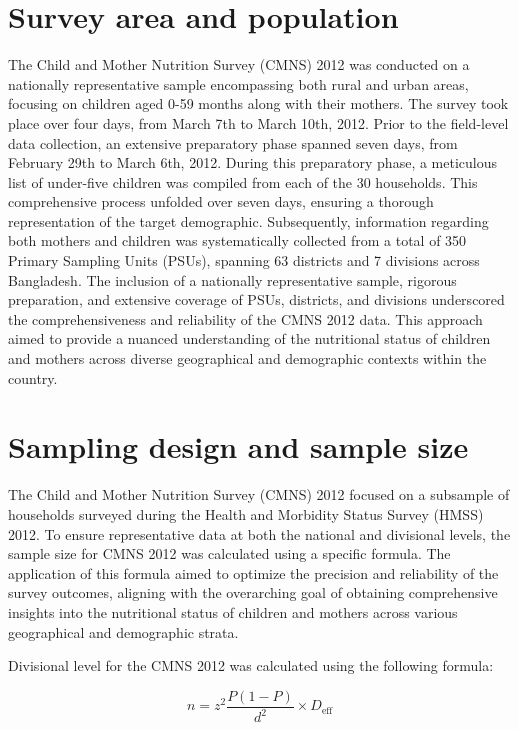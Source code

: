 \documentclass{report}
\begin{document}
\section{Survey area and population}

The Child and Mother Nutrition Survey (CMNS) 2012 was conducted on a nationally representative sample encompassing both rural and urban areas, focusing on children aged 0-59 months along with their mothers. 
The survey took place over four days, from March 7th to March 10th, 2012. Prior to the field-level data collection, an extensive preparatory phase spanned seven days, from February 29th to March 6th, 2012.
During this preparatory phase, a meticulous list of under-five children was compiled from each of the 30 households. This comprehensive process unfolded over seven days, ensuring a thorough representation of the target demographic. 
Subsequently, information regarding both mothers and children was systematically collected from a total of 350 Primary Sampling Units (PSUs), spanning 63 districts and 7 divisions across Bangladesh. 
The inclusion of a nationally representative sample, rigorous preparation, and extensive coverage of PSUs, districts, and divisions underscored the comprehensiveness and reliability of the CMNS 2012 data. 
This approach aimed to provide a nuanced understanding of the nutritional status of children and mothers across diverse geographical and demographic contexts within the country.



\section{Sampling design and sample size }


The Child and Mother Nutrition Survey (CMNS) 2012 focused on a subsample of households surveyed during the Health and Morbidity Status Survey (HMSS) 2012. To ensure representative data at both the national and divisional levels, the sample size for CMNS 2012 was calculated using a specific formula. The application of this formula aimed to optimize the precision and reliability of the survey outcomes, aligning with the overarching goal of obtaining comprehensive insights into the nutritional status of children and mothers across various geographical and demographic strata.

Divisional level for the CMNS 2012 was calculated using the following formula:

\[ n = z^2 \frac{P(1-P)}{d^2} \times D_{\text{eff}} \]
\end{document}
